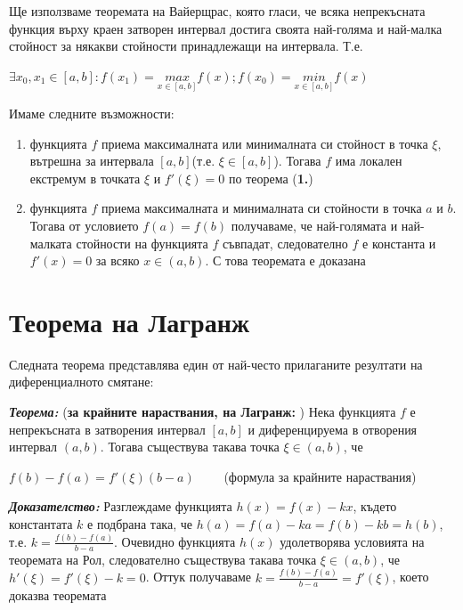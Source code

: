 \documentclass[11pt]{article} %
\newcommand{\italicBold}[1]{\textbf{\emph{#1}}}
\newcommand{\theorem}{\italicBold{Теорема: }}
\newcommand{\proof}{\italicBold{Доказателство: }}
\newcommand{\enumNum}{\renewcommand{\theenumi}{\arabic{enumi}}}
\begin{document}
Ще използваме теоремата на Вайерщрас, която гласи, че всяка непрекъсната функция върху краен затворен интервал достига своята най-голяма и най-малка стойност за някакви стойности принадлежащи на интервала. Т.е.\\
\centerline{$\exists x_{0}, x_{1} \in [a,b]:f(x_{1})=\underset{x \in [a,b]}{max} f(x); f(x_{0}) = \underset{x \in [a,b]}{min} f(x)$}
 Имаме следните възможности:\\

\enumNum
\begin{enumerate}
	\item функцията $f$ приема максималната или минималната си стойност в точка $\xi$, вътрешна за интервала $[a,b]$(т.е. $\xi \in [a,b]$). Тогава $f$ има локален екстремум в точката $\xi$ и $f'(\xi) = 0$ по теорема (\textbf{1.})\\
	\item функцията $f$ приема максималната и минималната си стойности в точка $a$ и $b$. Тогава от условието $f(a) = f(b)$ получаваме, че най-голямата и най-малката стойности на функцията $f$ съвпадат, следователно $f$ е константа и $f'(x)=0$ за всяко $x \in (a,b)$. С това теоремата е доказана\\\par
\end{enumerate}

\section{Теорема на Лагранж}
Следната теорема представлява един от най-често прилаганите резултати на диференциалното смятане:\par
\theorem (\textbf{за крайните нараствания, на Лагранж: }) Нека функцията $f$ е непрекъсната в затворения интервал $[a,b]$ и диференцируема в отворения интервал $(a,b)$. Тогава съществува такава точка $\xi \in (a,b)$, че \\
\centerline{$f(b)-f(a)=f'(\xi)(b-a) \qquad$ (формула за крайните нараствания)}
\par
\proof Разглеждаме функцията $h(x)=f(x)-kx$, където константата $k$ е подбрана така, че $h(a)=f(a)-ka=f(b)-kb=h(b)$, т.е. $k = \frac{f(b)-f(a)}{b-a}$. Очевидно функцията $h(x)$ удолетворява условията на теоремата на Рол, следователно съществува такава точка $\xi \in (a,b)$, че $h'(\xi)=f'(\xi)-k=0$. Оттук получаваме $k = \frac{f(b)-f(a)}{b-a} = f'(\xi)$, което доказва теоремата \\\par
\end{document}
